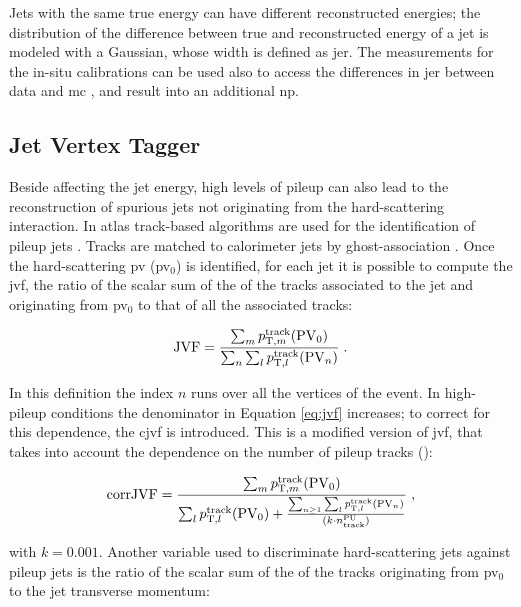 Jets with the same true energy can have different reconstructed energies; the distribution of the difference between true and reconstructed energy of a jet is modeled with a Gaussian, whose width is defined as \gls{jer}. The measurements for the in-situ calibrations can be used also to access the differences in \gls{jer} between data and \gls{mc} \cite{TheATLAScollaboration:2015ofv,ATLAS:2015uwa}, and result into an additional \gls{np}.

\subsection{Jet Vertex Tagger}
\label{sec:jvt}

Beside affecting the jet energy, high levels of pileup can also lead to the reconstruction of spurious jets not originating from the hard-scattering interaction. In \gls{atlas} track-based algorithms are used for the identification of pileup jets \cite{Aad:2015ina,ATLAS:2014cva}. 
Tracks are matched to calorimeter jets by ghost-association \cite{Soyez:2012hv}. Once the hard-scattering \gls{pv} (\gls{pv}$_0$) is identified, 
for each jet it is possible to compute the \gls{jvf}, the ratio of the scalar sum of the \pt of the tracks associated to the jet and originating from  \gls{pv}$_0$ to that of all the associated tracks:

\begin{equation}
 {\rm JVF} = \frac{\sum_m{p_{{\rm T}, m}^{{\rm track}}({\rm PV}_0)}}{\sum_n\sum_l  p_{{\rm T}, l}^{{\rm track}}({\rm PV}_n)} \; .
 \label{eq:jvf}
\end{equation} 

\noindent In this definition the index $n$ runs over all the vertices of the event. In high-pileup conditions the denominator in 
Equation \ref{eq:jvf} increases; to correct for this dependence, the \gls{cjvf} is introduced. 
This is a modified version of \gls{jvf}, that takes into account the dependence on the number of pileup tracks (\nPUtrk):

\begin{equation}
{\rm corrJVF} = \frac{\sum_m{p_{{\rm T}, m}^{{\rm track}}({\rm PV}_0)}}{\sum_l p_{{\rm T}, l}^{{\rm track}}({\rm PV}_0) + \frac{\sum_{n\geq1}\sum_l p_{{\rm T}, l}^{{\rm track}}({\rm PV}_n)}{ (k \cdot n_\mathrm{track}^\mathrm{PU})}} \; ,
\label{eq:corrJVF}
\end{equation}

\noindent with $k=0.001$. Another variable used to discriminate hard-scattering jets against pileup jets is the ratio of the scalar
sum of the \pt of the tracks originating from \gls{pv}$_0$ to the jet transverse momentum:


